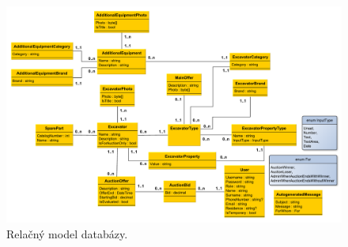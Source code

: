 \begin{figure}[H]\centering
\includegraphics[width=140mm]{../img/relacny model uml}
\caption{Relačný model databázy.}
\label{relacny model uml}
\end{figure}


